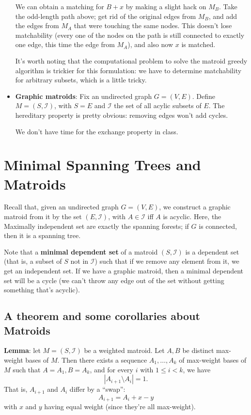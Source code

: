 \documentclass{article}
\newcommand{\I}{\mathcal{I}}
\begin{document}
\begin{itemize}
	We can obtain a matching for $B + x$ by making a slight
	hack on $M_B$.
	Take the odd-length path above; get rid of the original edges
	from $M_B$, and add the edges from $M_A$ that were touching
	the same nodes.
	This doesn't lose matchability (every one of the nodes on the
	path is still connected to exactly one edge, this time the edge
	from $M_A$), and also now $x$ is matched.
	
	It's worth noting that the computational problem to solve the matroid
	greedy algorithm is trickier for this formulation: we have to determine
	matchability for arbitrary subsets, which is a little tricky.
	
	\item
	\textbf{Graphic matroids}:
	Fix an undirected graph $G=(V,E)$.
	Define $M = (S,\mathcal I)$, with $S = E$
	and
	$\mathcal I$ the set of all acylic subsets of $E$.
	The hereditary property is pretty obvious: removing edges won't
	add cycles.
	
	We don't have time for the exchange property in class.
	
	
\end{itemize}
 



\section{Minimal Spanning Trees and Matroids}

Recall that, given an undirected graph $G=(V,E)$, we construct a graphic
matroid from it by the set $(E,\I)$, with $A\in\I$ iff $A$ is acyclic.
Here, the Maximally independent set are exactly the spanning forests;
if $G$ is connected, then it is a spanning tree.

Note that a \textbf{minimal dependent set} of a matroid $(S,\I)$ 
is a dependent set (that is, a subset of $S$ not in $\I$) such that if we
remove any element from it, we get an independent set.
If we have a graphic matroid, then a minimal dependent set will be a cycle
(we can't throw any edge out of the set without getting something
that's acyclic).

\subsection{A theorem and some corollaries about Matroids}

\textbf{Lemma}:
let $M=(S, \I)$ be a weighted matroid.
Let $A,B$ be distinct max-weight bases of
$M$.
Then there exists a sequence $A_1, \ldots, A_k$ of max-weight bases of $M$
such that $A=A_1, B=A_k$, and for every $i$ with $1\leq i < k$, we have
$$
|A_{i+1} \setminus A_i| = 1.
$$
That is, $A_{i+1}$ and $A_i$ differ by a ``swap'':
$$
A_{i+1} = A_i + x - y
$$
with $x$ and $y$ having equal weight (since they're all max-weight).
\end{document}
